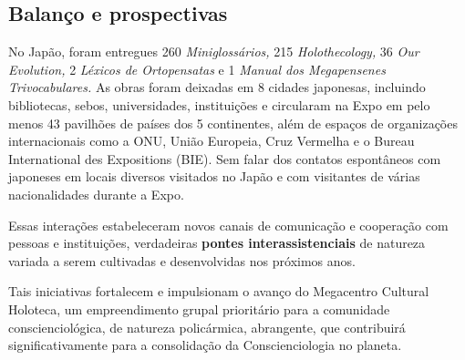 \documentclass{gescons}
\begin{document}
\subsection*{Balanço e prospectivas}


No Japão, foram entregues 260 \emph{Miniglossários,} 215 \emph{Holothecology,} 36 \emph{Our Evolution,} 2 \emph{Léxicos de Ortopensatas} e 1 \emph{Manual dos Megapensenes Trivocabulares.} As obras foram deixadas em 8 cidades japonesas, incluindo bibliotecas, sebos, universidades, instituições e circularam na Expo em pelo menos 43 pavilhões de países dos 5 continentes, além de espaços de organizações internacionais como a ONU, União Europeia, Cruz Vermelha e o Bureau International des Expositions (BIE). Sem falar dos contatos espontâneos com japoneses em locais diversos visitados no Japão e com visitantes de várias nacionalidades durante a Expo.

Essas interações estabeleceram novos canais de comunicação e cooperação com pessoas e instituições, verdadeiras \textbf{pontes interassistenciais} de natureza variada a serem cultivadas e desenvolvidas nos próximos anos.

Tais iniciativas fortalecem e impulsionam o avanço do Megacentro Cultural Holoteca, um empreendimento grupal prioritário para a comunidade conscienciológica, de natureza policármica, abrangente, que contribuirá significativamente para a consolidação da Conscienciologia no planeta.


        
\end{document}
